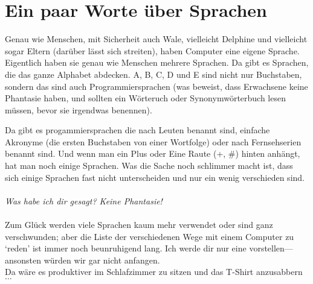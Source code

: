 \section{Ein paar Worte über Sprachen}

Genau wie Menschen, mit Sicherheit auch Wale, vielleicht Delphine und vielleicht sogar Eltern (darüber lässt sich streiten), haben Computer eine eigene Sprache. Eigentlich haben sie genau wie Menschen mehrere Sprachen. Da gibt es Sprachen, die das ganze Alphabet abdecken. A, B, C, D und E sind nicht nur Buchstaben, sondern das sind auch Programmiersprachen (was beweist, dass Erwachsene keine Phantasie haben, und sollten ein Wörteruch oder Synonymwörterbuch lesen müssen, bevor sie irgendwas benennen).

Da gibt es progammiersprachen die nach Leuten benannt sind, einfache Akronyme (die ersten Buchstaben von einer Wortfolge) oder nach Fernsehserien benannt sind. Und wenn man ein Plus oder Eine Raute (+, \#) hinten anhängt, hat man noch einige Sprachen. Was die Sache noch schlimmer macht ist, dass sich einige Sprachen fast nicht unterscheiden und nur ein wenig verschieden sind.
\\
\\
\emph{Was habe ich dir gesagt? Keine Phantasie!}
\\
\\
Zum Glück werden viele Sprachen kaum mehr verwendet oder sind ganz verschwunden; aber die Liste der verschiedenen Wege mit einem Computer zu `reden' ist immer noch beunruhigend lang. Ich werde dir nur eine vorstellen---ansonsten würden wir gar nicht anfangen.
\\
Da wäre es produktiver im Schlafzimmer zu sitzen und das T-Shirt anzusabbern$\ldots$

